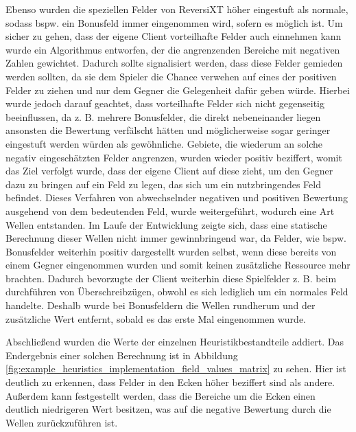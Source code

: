 \documentclass[12pt,a4paper,bibliography=totocnumbered,listof=totocnumbered]{article}
\begin{document}
Ebenso wurden die speziellen Felder von ReversiXT höher eingestuft als normale, sodass bspw. ein Bonusfeld immer eingenommen wird, sofern es möglich ist. Um sicher zu gehen, dass der eigene Client vorteilhafte Felder auch einnehmen kann wurde ein Algorithmus entworfen, der die angrenzenden Bereiche mit negativen Zahlen gewichtet. Dadurch sollte signalisiert werden, dass diese Felder gemieden werden sollten, da sie dem Spieler die Chance verwehen auf eines der positiven Felder zu ziehen und nur dem Gegner die Gelegenheit dafür geben würde. Hierbei wurde jedoch darauf geachtet, dass vorteilhafte Felder sich nicht gegenseitig beeinflussen, da z. B. mehrere Bonusfelder, die direkt nebeneinander liegen ansonsten die Bewertung verfälscht hätten und möglicherweise sogar geringer eingestuft werden würden als gewöhnliche. Gebiete, die wiederum an solche negativ eingeschätzten Felder angrenzen, wurden wieder positiv beziffert, womit das Ziel verfolgt wurde, dass der eigene Client auf diese zieht, um den Gegner dazu zu bringen auf ein Feld zu legen, das sich um ein nutzbringendes Feld befindet. Dieses Verfahren von abwechselnder negativen und positiven Bewertung ausgehend von dem bedeutenden Feld, wurde weitergeführt, wodurch eine Art Wellen entstanden.
Im Laufe der Entwicklung zeigte sich, dass eine statische Berechnung dieser Wellen nicht immer gewinnbringend war, da Felder, wie bspw. Bonusfelder weiterhin positiv dargestellt wurden selbst, wenn diese bereits von einem Gegner eingenommen wurden und somit keinen zusätzliche Ressource mehr brachten. Dadurch bevorzugte der Client weiterhin diese Spielfelder z. B. beim durchführen von Überschreibzügen, obwohl es sich lediglich um ein normales Feld handelte. Deshalb wurde bei Bonusfeldern die Wellen rundherum und der zusätzliche Wert entfernt, sobald es das erste Mal eingenommen wurde.

Abschließend wurden die Werte der einzelnen Heuristikbestandteile addiert. Das Endergebnis einer solchen Berechnung ist in Abbildung \ref{fig:example_heuristics_implementation_field_values_matrix} zu sehen. Hier ist deutlich zu erkennen, dass Felder in den Ecken höher beziffert sind als andere. Außerdem kann festgestellt werden, dass die Bereiche um die Ecken einen deutlich niedrigeren Wert besitzen, was auf die negative Bewertung durch die Wellen zurückzuführen ist.
\end{document}

